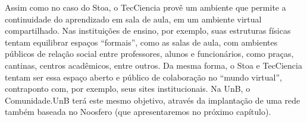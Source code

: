 Assim como no caso do Stoa, o TecCiencia provê um ambiente que permite a continuidade do
aprendizado em sala de aula, em um ambiente virtual compartilhado.
%
Nas instituições de ensino, por exemplo, suas estruturas físicas tentam equilibrar espaços ``formais'',
como as salas de aula, com ambientes públicos de relação social entre professores, alunos e funcionários,
como praças, cantinas, centros acadêmicos, entre outros. Da mesma forma, o Stoa e TecCiencia tentam
ser essa espaço aberto e público de colaboração no ``mundo virtual'', contraponto com, por exemplo, seus
sites institucionais.
%
Na UnB, o Comunidade.UnB terá este mesmo objetivo, através da implantação de uma
rede também baseada no Noosfero (que apresentaremos no próximo capítulo).
